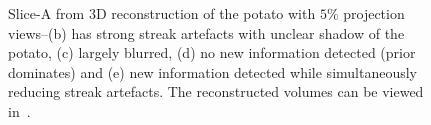 \documentclass[journal]{IEEEtran}
\begin{document}
\begin{figure}[!h]
\centering
{}\hfill
{}\hfill
{}\hfill
{}\hfill
{}
\caption{Slice-A from 3D reconstruction of the potato with $5\%$ projection views--(b) has strong streak artefacts with unclear shadow of the potato, (c) largely blurred, (d) no new information detected (prior dominates) and (e) new information detected while simultaneously reducing streak artefacts. The reconstructed volumes can be viewed in~\cite{supp_paper}.}
\label{fig:potato_3D_results_A}
\end{figure}
\end{document}
